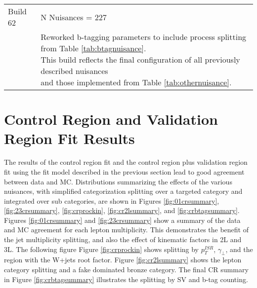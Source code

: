 \begin{table}
\begin{tabular}{ll}
 & \\
\hline 
Build 62 & N Nuisances = 227 \\
\hline
 & \makecell[l]{Reworked b-tagging parameters to include process splitting from Table \ref{tab:btagnuisance}. \\ This build reflects the final configuration of all previously described nuisances \\ and those implemented from Table \ref{tab:othernuisance}. } \\
\end{tabular} 
\label{tab:builds}
\end{table}
\section{Control Region and Validation Region Fit Results}
The results of the control region fit and the control region plus validation region fit using the fit model described in the previous section lead to good agreement between data and MC. Distributions summarizing the effects of the various nuisances, with simplified categorization splitting over a targeted category and integrated over sub categories, are shown in Figures \ref{fig:01crsummary}, \ref{fig:23crsummary}, \ref{fig:crprockin}, \ref{fig:cr2lsummary}, and \ref{fig:crbtagsummary}. Figures \ref{fig:01crsummary} and \ref{fig:23crsummary} show a summary of the data and MC agreement for each lepton multiplicity. This demonstrates the benefit of the jet multiplicity splitting, and also the effect of kinematic factors in 2L and 3L. The following figure Figure \ref{fig:crprockin} shows splitting by $p_T^{ISR}$, $\gamma_\perp$, and the region with the W+jets root factor. Figure \ref{fig:cr2lsummary} shows the lepton category splitting and a fake dominated bronze category. The final CR summary in Figure \ref{fig:crbtagsummary} illustrates the splitting by SV and b-tag counting.



